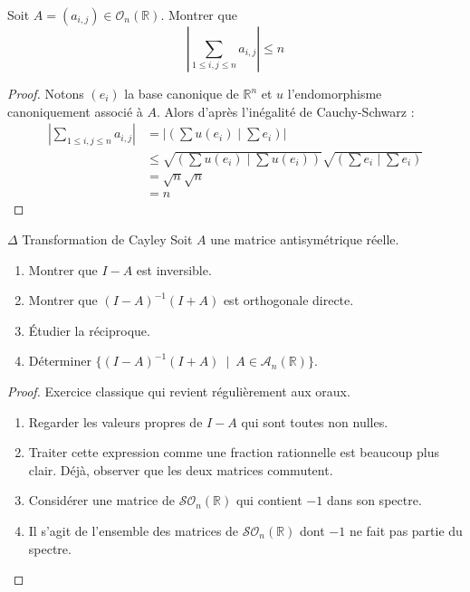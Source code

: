 \documentclass[french,a4paper]{article}
\newcommand{\R}{\mathbb{R}}
\newcommand{\inv}{^{-1}}
\theoremstyle{plain}
\theoremstyle{definition}
\theoremstyle{remark}
\begin{document}
\begin{ex}{}
	Soit $A=(a_{i,j})\in\mathcal{O}_n(\R)$. Montrer que $$\left\lvert\sum_{1\leqslant i,j\leqslant n}a_{i,j}\right\rvert\leqslant n$$
\end{ex}
\begin{proof}
	Notons $(e_i)$ la base canonique de $\R^n$ et $u$ l'endomorphisme canoniquement associé à $A$. Alors d'après l'inégalité de Cauchy-Schwarz : \begin{align*}
		\left\lvert\sum_{1\leqslant i,j\leqslant n}a_{i,j}\right\rvert&=\left\lvert\left(\sum u(e_i)\mid \sum e_i\right)\right\rvert \\
		&\leqslant\sqrt{\left(\sum u(e_i)\mid \sum u(e_i)\right)}\sqrt{\left(\sum e_i\mid \sum e_i\right)}\\
		&=\sqrt{n}\sqrt{n}\\
		&=n
	\end{align*}
\end{proof}

\begin{ex}{$\Delta$ Transformation de Cayley}
	Soit $A$ une matrice antisymétrique réelle.
	\begin{enumerate}
		\item Montrer que $I-A$ est inversible.
		\item Montrer que $(I-A)\inv(I+A)$ est orthogonale directe.
		\item Étudier la réciproque.
		\item Déterminer $\{(I-A)\inv(I+A)\ \mid\ A\in\mathcal{A}_n(\R)\}$.
	\end{enumerate}
\end{ex}
\begin{proof}
	Exercice classique qui revient régulièrement aux oraux.
	\begin{enumerate}
		\item Regarder les valeurs propres de $I-A$ qui sont toutes non nulles.
		\item Traiter cette expression comme une fraction rationnelle est beaucoup plus clair. Déjà, observer que les deux matrices commutent.
		\item Considérer une matrice de $\mathcal{SO}_n(\R)$ qui contient $-1$ dans son spectre.
		\item Il s'agit de l'ensemble des matrices de $\mathcal{SO}_n(\R)$ dont $-1$ ne fait pas partie du spectre.
	\end{enumerate}
\end{proof}
\end{document}

